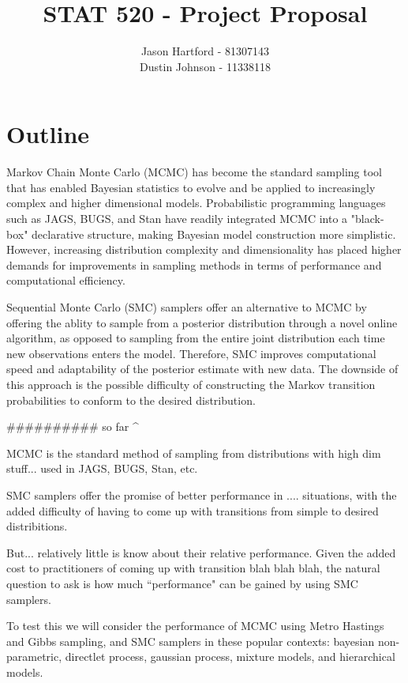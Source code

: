 \documentclass[11pt, oneside]{amsart}
\title{STAT 520 - Project Proposal}
\author{Jason Hartford - 81307143 \\
Dustin Johnson - 11338118}
\begin{document}
\maketitle


\section{Outline}

Markov Chain Monte Carlo (MCMC) has become the standard sampling tool that has enabled Bayesian statistics to evolve and be applied to increasingly complex and higher dimensional models. Probabilistic programming languages such as JAGS, BUGS, and Stan have readily integrated MCMC into a "black-box" declarative structure, making Bayesian model construction more simplistic. However, increasing distribution complexity and dimensionality has placed higher demands for improvements in sampling methods in terms of performance and computational efficiency. 
	
Sequential Monte Carlo (SMC) samplers offer an alternative to MCMC by offering the ablity to sample from a posterior distribution through a novel online algorithm, as opposed to sampling from the entire joint distribution each time new observations enters the model. Therefore, SMC improves computational speed and adaptability of the posterior estimate with new data. The downside of this approach is the possible difficulty of constructing the Markov transition probabilities to conform to the desired distribution.

########## so far ^

MCMC is the standard method of sampling from distributions with high dim stuff...  used in JAGS, BUGS, Stan, etc.

SMC samplers offer the promise of better performance in .... situations, with the added difficulty of having to come up with transitions from simple to desired distribitions.

But... relatively little is know about their relative performance. Given the added cost to practitioners of coming up with transition blah blah blah, the natural question to ask is how much ``performance" can be gained by using SMC samplers.

To test this we will consider the performance of MCMC using Metro Hastings and Gibbs sampling, and SMC samplers in these popular contexts: bayesian non-parametric, directlet process, gaussian process, mixture models, and hierarchical models.

% 
\end{document}
